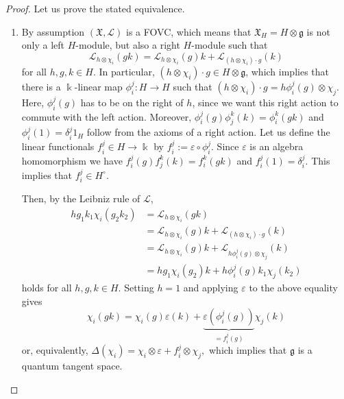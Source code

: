 \documentclass{article}
\theoremstyle{definition}
\begin{document}
	\begin{proof}
		Let us prove the stated equivalence.
		\begin{enumerate}
			\item[i.) $\Rightarrow$ ii.)] By assumption $(\mathfrak{X},\mathscr{L})$ is a FOVC, which means that $\mathfrak{X}_H=H\otimes\mathfrak{g}$ is not only a left $H$-module, but also a right $H$-module such that
			$$
			\mathscr{L}_{h\otimes\chi_i}(gk)
			=\mathscr{L}_{h\otimes\chi_i}(g)k
			+\mathscr{L}_{(h\otimes\chi_i)\cdot g}(k)
			$$
			for all $h,g,k\in H$. In particular, $(h\otimes\chi_i)\cdot g\in H\otimes\mathfrak{g}$, which implies that there is a $\Bbbk$-linear map $\phi_i^j\colon H\to H$ such that $(h\otimes\chi_i)\cdot g=h\phi_i^j(g)\otimes\chi_j$. Here, $\phi_i^j(g)$ has to be on the right of $h$, since we want this right action to commute with the left action. Moreover, $\phi_i^j(g)\phi_j^k(k)=\phi_i^k(gk)$ and $\phi_i^j(1)=\delta_i^j1_H$ follow from the axioms of a right action. Let us define the linear functionals $f_i^j\in H\to\Bbbk$ by $f_i^j:=\varepsilon\circ\phi_i^j$. Since $\varepsilon$ is an algebra homomorphism we have $f_i^j(g)f_j^k(k)=f_i^k(gk)$ and $f_i^j(1)=\delta_i^j$. This implies that $f_i^j\in H^\circ$.
			
			Then, by the Leibniz rule of $\mathscr{L}$,
			\begin{align*}
				hg_1k_1\chi_i(g_2k_2)
				&=\mathscr{L}_{h\otimes\chi_i}(gk)\\
				&=\mathscr{L}_{h\otimes\chi_i}(g)k
				+\mathscr{L}_{(h\otimes\chi_i)\cdot g}(k)\\
				&=\mathscr{L}_{h\otimes\chi_i}(g)k
				+\mathscr{L}_{h\phi_i^j(g)\otimes\chi_j}(k)\\
				&=hg_1\chi_i(g_2)k+h\phi_i^j(g)k_1\chi_j(k_2)
			\end{align*}
			holds for all $h,g,k\in H$. Setting $h=1$ and applying $\varepsilon$ to the above equality gives
			$$
			\chi_i(gk)=\chi_i(g)\varepsilon(k)+\underbrace{\varepsilon(\phi_i^j(g))}_{=f_i^j(g)}\chi_j(k)
			$$
			or, equivalently,
			$
			\Delta(\chi_i)=\chi_i\otimes\varepsilon+f_i^j\otimes\chi_j,
			$
			which implies that $\mathfrak{g}$ is a quantum tangent space.
			

\end{enumerate}
\end{proof}
\end{document}
